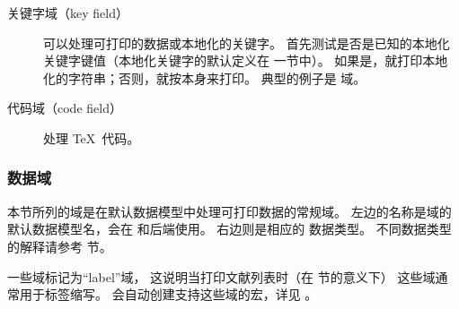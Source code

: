 \begin{description}
\begin{description}

\item[关键字域（key field）] 可以处理可打印的数据或本地化的关键字。
首先测试是否是已知的本地化关键字键值（本地化关键字的默认定义在  一节中）。
如果是，就打印本地化的字符串；否则，就按本身来打印。
典型的例子是  域。


\item[代码域（code field）] 处理 \TeX\ 代码。

\end{description}
\end{description}

\subsubsection{数据域}%
\label{bib:fld:dat}


本节所列的域是在默认数据模型中处理可打印数据的常规域。
左边的名称是域的默认数据模型名，会在 \biblatex 和后端使用。
右边则是相应的 \biblatex 数据类型。
不同数据类型的解释请参考  节。


一些域标记为“label”域，
这说明当打印文献列表时（在 节的意义下）
这些域通常用于标签缩写。
\biblatex 会自动创建支持这些域的宏，详见 。

